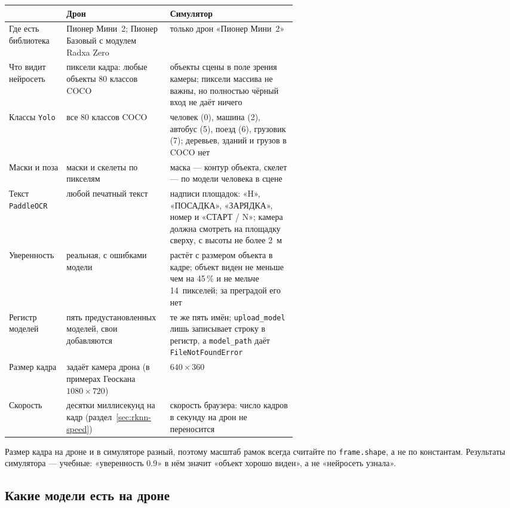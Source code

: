 \begin{center}
\small
\begin{tabularx}{\linewidth}{@{}>{\raggedright\arraybackslash}p{0.2\linewidth} >{\raggedright\arraybackslash}p{0.36\linewidth} X@{}}
\toprule
 & \textbf{Дрон} & \textbf{Симулятор} \\
\midrule
Где есть библиотека & Пионер Мини~2; Пионер Базовый с модулем Radxa Zero & только дрон «Пионер Мини~2» \\
Что видит нейросеть & пиксели кадра: любые объекты 80 классов COCO & объекты сцены в поле зрения камеры; пиксели массива не важны, но полностью чёрный вход не даёт ничего \\
Классы \texttt{Yolo} & все 80 классов COCO & человек (0), машина (2), автобус (5), поезд (6), грузовик (7); деревьев, зданий и грузов в COCO нет \\
Маски и поза & маски и скелеты по пикселям & маска --- контур объекта, скелет --- по модели человека в сцене \\
Текст \texttt{PaddleOCR} & любой печатный текст & надписи площадок: «H», «ПОСАДКА», «ЗАРЯДКА», номер и «СТАРТ / N»; камера должна смотреть на площадку сверху, с высоты не более 2~м \\
Уверенность & реальная, с ошибками модели & растёт с размером объекта в кадре; объект виден не меньше чем на 45\,\% и не мельче 14~пикселей; за преградой его нет \\
Регистр моделей & пять предустановленных моделей, свои добавляются & те же пять имён; \verb|upload_model| лишь записывает строку в регистр, а \verb|model_path| даёт \verb|FileNotFoundError| \\
Размер кадра & задаёт камера дрона (в примерах Геоскана $1080\times720$) & $640\times360$ \\
Скорость & десятки миллисекунд на кадр (раздел~\ref{sec:rknn-speed}) & скорость браузера: число кадров в секунду на дрон не переносится \\
\bottomrule
\end{tabularx}
\end{center}

Размер кадра на дроне и в симуляторе разный, поэтому масштаб рамок всегда считайте по \verb|frame.shape|, а не по константам. Результаты симулятора --- учебные: «уверенность 0.9» в нём значит «объект хорошо виден», а не «нейросеть узнала».

\subsection{Какие модели есть на дроне}

